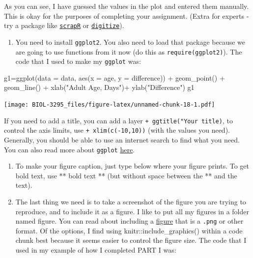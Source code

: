 \documentclass[
]{book}
\newenvironment{Shaded}{\begin{snugshade}}{\end{snugshade}}
\newcommand{\AttributeTok}[1]{\textcolor[rgb]{0.77,0.63,0.00}{#1}}
\newcommand{\FunctionTok}[1]{\textcolor[rgb]{0.00,0.00,0.00}{#1}}
\newcommand{\NormalTok}[1]{#1}
\newcommand{\OtherTok}[1]{\textcolor[rgb]{0.56,0.35,0.01}{#1}}
\newcommand{\SpecialCharTok}[1]{\textcolor[rgb]{0.00,0.00,0.00}{#1}}
\newcommand{\StringTok}[1]{\textcolor[rgb]{0.31,0.60,0.02}{#1}}
\providecommand{\tightlist}{%
  \setlength{\itemsep}{0pt}\setlength{\parskip}{0pt}}
\begin{document}
As you can see, I have guessed the values in the plot and entered them manually. This is okay for the purposes of completing your assignment. (Extra for experts - try a package like \href{https://github.com/adamkucharski/scrapR}{\texttt{scrapR}} or \href{https://github.com/tpoisot/digitize}{\texttt{digitize}}).

\begin{enumerate}
\def\labelenumi{\arabic{enumi}.}
\setcounter{enumi}{5}
\tightlist
\item
  You need to install \texttt{ggplot2}. You also need to load that package because we are going to use functions from it now (do this as \texttt{require(ggplot2)}). The code that I used to make my \texttt{ggplot} was:
\end{enumerate}

\begin{Shaded}
\begin{Highlighting}[]
\NormalTok{g1}\OtherTok{=}\FunctionTok{ggplot}\NormalTok{(}\AttributeTok{data =}\NormalTok{ data, }\FunctionTok{aes}\NormalTok{(}\AttributeTok{x =}\NormalTok{ age, }\AttributeTok{y =}\NormalTok{ difference)) }\SpecialCharTok{+} 
  \FunctionTok{geom\_point}\NormalTok{() }\SpecialCharTok{+}
  \FunctionTok{geom\_line}\NormalTok{() }\SpecialCharTok{+}
  \FunctionTok{xlab}\NormalTok{(}\StringTok{"Adult Age, Days"}\NormalTok{)}\SpecialCharTok{+}
  \FunctionTok{ylab}\NormalTok{(}\StringTok{"Difference"}\NormalTok{)}
\NormalTok{g1}
\end{Highlighting}
\end{Shaded}

\texttt{[image: BIOL-3295\_files/figure-latex/unnamed-chunk-18-1.pdf]}

If you need to add a title, you can add a layer \texttt{+\ ggtitle("Your\ title)}, to control the axis limits, use \texttt{+\ xlim(c(-10,10))} (with the values you need). Generally, you should be able to use an internet search to find what you need. You can also read more about \texttt{ggplot} \href{https://ahurford.github.io/quant-guide-all-courses/ggplot.html}{here}.

\begin{enumerate}
\def\labelenumi{\arabic{enumi}.}
\setcounter{enumi}{6}
\item
  To make your figure caption, just type below where your figure prints. To get bold text, use ** bold text ** (but without space between the ** and the text).
\item
  The last thing we need is to take a screenshot of the figure you are trying to reproduce, and to include it as a figure. I like to put all my figures in a folder named figure. You can read about including a \href{https://bookdown.org/yihui/rmarkdown/r-code.html\#figures}{figure} that is a \texttt{.png} or other format. Of the options, I find using knitr::include\_graphics() within a code chunk best because it seems easier to control the figure size. The code that I used in my example of how I completed PART I was:
\end{enumerate}
\end{document}
